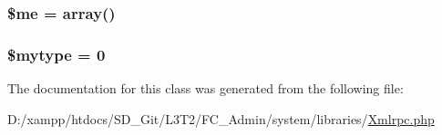\subsubsection[{\$me}]{\setlength{\rightskip}{0pt plus 5cm}\$me = array()}\label{class_x_m_l___r_p_c___values_ad856a60cee1894f180e845f9b7b81458}
\hypertarget{class_x_m_l___r_p_c___values_a49afa471d90298c2a53fb4dba2b099bf}{}
\subsubsection[{\$mytype}]{\setlength{\rightskip}{0pt plus 5cm}\$mytype = 0}\label{class_x_m_l___r_p_c___values_a49afa471d90298c2a53fb4dba2b099bf}


The documentation for this class was generated from the following file\+:\begin{DoxyCompactItemize}
\item 
D\+:/xampp/htdocs/\+S\+D\+\_\+\+Git/\+L3\+T2/\+F\+C\+\_\+\+Admin/system/libraries/\hyperlink{_xmlrpc_8php}{Xmlrpc.\+php}\end{DoxyCompactItemize}
